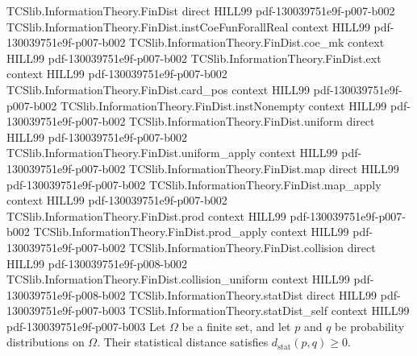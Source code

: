 \begin{theorem}
\label{TCSlib.InformationTheory.statDist_nonneg}
\leanok
\proofstep
  {TCSlib.InformationTheory.FinDist}
  {direct}
  {HILL99}
  {pdf-130039751e9f-p007-b002}
\proofstep
  {TCSlib.InformationTheory.FinDist.instCoeFunForallReal}
  {context}
  {HILL99}
  {pdf-130039751e9f-p007-b002}
\proofstep
  {TCSlib.InformationTheory.FinDist.coe_mk}
  {context}
  {HILL99}
  {pdf-130039751e9f-p007-b002}
\proofstep
  {TCSlib.InformationTheory.FinDist.ext}
  {context}
  {HILL99}
  {pdf-130039751e9f-p007-b002}
\proofstep
  {TCSlib.InformationTheory.FinDist.card_pos}
  {context}
  {HILL99}
  {pdf-130039751e9f-p007-b002}
\proofstep
  {TCSlib.InformationTheory.FinDist.instNonempty}
  {context}
  {HILL99}
  {pdf-130039751e9f-p007-b002}
\proofstep
  {TCSlib.InformationTheory.FinDist.uniform}
  {direct}
  {HILL99}
  {pdf-130039751e9f-p007-b002}
\proofstep
  {TCSlib.InformationTheory.FinDist.uniform_apply}
  {context}
  {HILL99}
  {pdf-130039751e9f-p007-b002}
\proofstep
  {TCSlib.InformationTheory.FinDist.map}
  {direct}
  {HILL99}
  {pdf-130039751e9f-p007-b002}
\proofstep
  {TCSlib.InformationTheory.FinDist.map_apply}
  {context}
  {HILL99}
  {pdf-130039751e9f-p007-b002}
\proofstep
  {TCSlib.InformationTheory.FinDist.prod}
  {context}
  {HILL99}
  {pdf-130039751e9f-p007-b002}
\proofstep
  {TCSlib.InformationTheory.FinDist.prod_apply}
  {context}
  {HILL99}
  {pdf-130039751e9f-p007-b002}
\proofstep
  {TCSlib.InformationTheory.FinDist.collision}
  {direct}
  {HILL99}
  {pdf-130039751e9f-p008-b002}
\proofstep
  {TCSlib.InformationTheory.FinDist.collision_uniform}
  {context}
  {HILL99}
  {pdf-130039751e9f-p008-b002}
\proofstep
  {TCSlib.InformationTheory.statDist}
  {direct}
  {HILL99}
  {pdf-130039751e9f-p007-b003}
\proofstep
  {TCSlib.InformationTheory.statDist_self}
  {context}
  {HILL99}
  {pdf-130039751e9f-p007-b003}
Let $\Omega$ be a finite set, and let $p$ and $q$ be probability distributions on
$\Omega$. Their statistical distance satisfies $d_{\mathrm{stat}}(p,q)\ge 0$.
\end{theorem}

